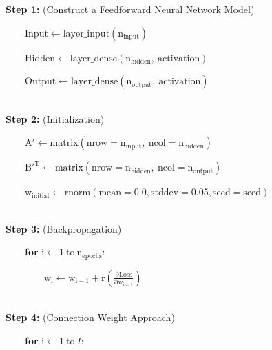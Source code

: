 \documentclass[]{interact}
\theoremstyle{plain}%
\theoremstyle{definition}
\theoremstyle{remark}
\begin{document}
\newcommand\mycommfont[1]{\footnotesize\ttfamily\textcolor{blue}{#1}}

\begin{minipage}{0.90\textwidth}
\begin{algorithm}[H]
\SetAlgoLined
  
   \textbf{Step 1:} (Construct a Feedforward Neural Network Model)  
            
            \ \ \ \ $\mathrm{Input \leftarrow layer\_input(n_{input})}$
            
            \ \ \ \ $\mathrm{Hidden \leftarrow layer\_dense(n_{hidden},\: activation)}$ 
            
            \ \ \ \ $\mathrm{Output \leftarrow layer\_dense(n_{output},\: activation)}$ 
                
     \hspace*{\fill} \\
     \textbf{Step 2:} (Initialization)
     
            \ \ \ \ $\mathrm{A' \leftarrow matrix(nrow = n_{input},\: ncol = n_{hidden})}$
            
            \ \ \ \ $\mathrm{B'^T \leftarrow matrix(nrow = n_{hidden},\: ncol = n_{output})}$
            
            \ \ \ \ $\mathrm{w_{initial} \leftarrow rnorm(mean=0.0, stddev=0.05, seed=seed)}$        

     \hspace*{\fill} \\
     \textbf{Step 3:} (Backpropagation)
        
        \ \ \ \ \textbf{for} $\mathrm{i \leftarrow 1 \: to \: n_{epochs}:}$ 
        
        \ \ \ \ \ \ \ \ $\mathrm{w_{i} \leftarrow w_{i - 1} + r(\frac{\partial Loss}{\partial w_{i - 1}})}$ 
        
        
      \hspace*{\fill} \\
      \textbf{Step 4:} (Connection Weight Approach)
            
        \ \ \ \ \textbf{for} $\mathrm{i} \leftarrow 1 \: \mathrm{to} \: I$:
        

\end{algorithm}
\end{minipage}
\end{document}

